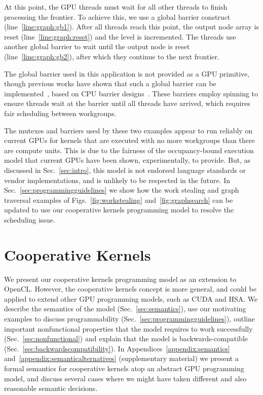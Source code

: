 \documentclass[parskip=half,sigconf,review, anonymous=true, acmcopyrightmode=none]{acmart}
\newcommand{\myfigs}{Figs.~}
\newcommand{\mysec}{Sec.~}
\begin{document}
At this point, the GPU threads must wait for all other threads to
finish processing the frontier. To achieve
this, we use a global barrier construct
(line~\ref{line:graph:gb1}). After all threads reach this point, the
output node array is reset (line~\ref{line:graph:reset}) and the level
is incremented. The threads use another global barrier to wait until the output node is
reset (line~\ref{line:graph:gb2}), after which they continue to the next frontier.

The global barrier used in this application is not provided as a GPU
primitive, though previous works have shown that such a global
barrier can be implemented~\cite{XF10,DBLP:conf/oopsla/SorensenDBGR16},
based on CPU barrier designs~\cite[ch. 17]{HS08}.
 These barriers employ spinning to ensure threads wait at the barrier until all
threads have arrived, which requires fair
scheduling between workgroups.%

The mutexes and barriers used by these two examples appear to run
reliably on current GPUs for kernels that are executed with no more
workgroups than there are compute units.  This is due to the fairness
of the occupancy-bound execution model that current GPUs have been
shown, experimentally, to provide.  But, as discussed in
\mysec\ref{sec:intro}, this model is not endorsed
language standards or vendor implementations, and is unlikely to be respected in the future.
%
In \mysec\ref{sec:programmingguidelines} we show how the work stealing
and graph traversal examples of \myfigs\ref{fig:workstealing} and~\ref{fig:graphsearch} can be
updated to use our cooperative kernels programming model to resolve
the scheduling issue.


\section{Cooperative Kernels}\label{sec:cooperativekernels}

We present our cooperative kernels programming model as an extension
to OpenCL.  However, the cooperative kernels concept is more general,
and could be applied to extend other GPU programming models, such as
CUDA and HSA.  We describe the semantics of the model
(\mysec\ref{sec:semantics}), use our motivating examples to discuss
programmability (\mysec\ref{sec:programmingguidelines}), outline
important nonfunctional properties that the model requires to work
successfully (\mysec\ref{sec:nonfunctional}) and explain that the
model is backwards-compatible
(\mysec\ref{sec:backwardscompatibility}).
%
In Appendices~\ref{appendix:semantics} and~\ref{appendix:semanticalternatives} (supplementary material)
we present a formal semantics for cooperative kernels atop an abstract GPU programming model,
and discuss several cases where we
might have taken different and also reasonable semantic decisions.
\end{document}
